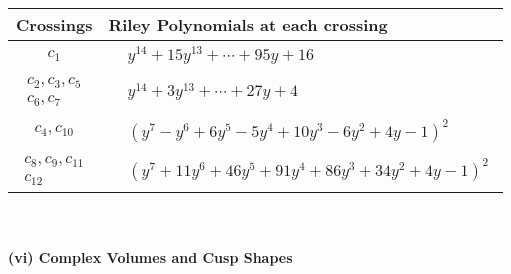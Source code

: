 \documentclass[1p]{elsarticle_modified}
\theoremstyle{definition}
\begin{document}
\begin{tabular}{m{50pt}|m{274pt}}
Crossings & \hspace{64pt}Riley Polynomials at each crossing \\
\hline $$\begin{aligned}c_{1}\end{aligned}$$&$\begin{aligned}
&y^{14}+15 y^{13}+\cdots+95 y+16
\end{aligned}$\\
\hline $$\begin{aligned}c_{2},c_{3},c_{5}\\c_{6},c_{7}\end{aligned}$$&$\begin{aligned}
&y^{14}+3 y^{13}+\cdots+27 y+4
\end{aligned}$\\
\hline $$\begin{aligned}c_{4},c_{10}\end{aligned}$$&$\begin{aligned}
&(y^7- y^6+6 y^5-5 y^4+10 y^3-6 y^2+4 y-1)^2
\end{aligned}$\\
\hline $$\begin{aligned}c_{8},c_{9},c_{11}\\c_{12}\end{aligned}$$&$\begin{aligned}
&(y^7+11 y^6+46 y^5+91 y^4+86 y^3+34 y^2+4 y-1)^2
\end{aligned}$\\
\hline
\end{tabular}\\~\\
\newpage\flushleft \textbf{(vi) Complex Volumes and Cusp Shapes}
\end{document}
